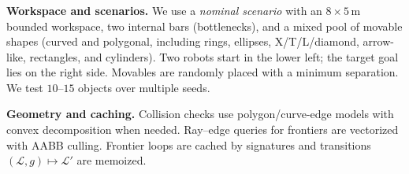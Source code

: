 \subsubsection{}
\label{subsec:sim-setup}

\textbf{Workspace and scenarios.}
We use a \emph{nominal scenario} with an $8{\times}5$\,m bounded
workspace, two internal bars (bottlenecks), and a mixed pool of movable
shapes (curved and polygonal, including rings, ellipses, X/T/L/diamond,
arrow-like, rectangles, and cylinders). Two robots start in the lower
left; the target goal lies on the right side. Movables are randomly
placed with a minimum separation. We test \(10\text{--}15\) objects
over multiple seeds.

\textbf{Geometry and caching.}
Collision checks use polygon/curve-edge models with convex
decomposition when needed. Ray--edge queries for frontiers are
vectorized with AABB culling. Frontier loops are cached by signatures and
transitions $(\mathcal{L},g)\!\mapsto\!\mathcal{L}'$ are memoized.

